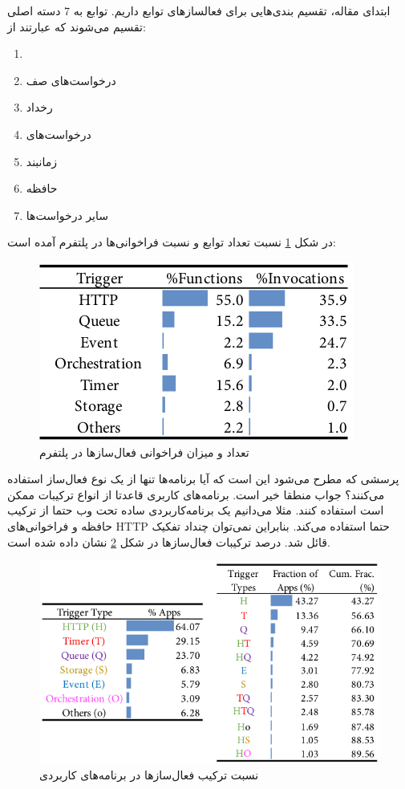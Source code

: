 ابتدای مقاله‌، تقسیم بندی‌هایی برای فعالساز‌های توابع داریم. توابع به 7 دسته اصلی تقسیم می‌شوند که عبارتند از: 

\begin{enumerate}
	\item {}
	\item درخواست‌های صف
	\item رخداد
	\item درخواست‌های 
	\item زمانبند
	\item حافظه
	\item سایر درخواست‌ها
\end{enumerate}

در شکل \ref{fig:Azure-Trigger-invocations} نسبت تعداد توابع و نسبت فراخوانی‌ها در پلتفرم  آمده است:‌

\begin{figure}
	\centering
	\includegraphics[width=0.8\linewidth]{figs/Azure-Trigger-invocations}
	\caption {تعداد و میزان فراخوانی فعال‌سازها در پلتفرم }
	\label{fig:Azure-Trigger-invocations}
\end{figure}

پرسشی که مطرح می‌شود این است که آیا برنامه‌ها تنها از یک نوع فعال‌ساز استفاده می‌کنند؟ جواب منطقا خیر است. برنامه‌های کاربری قاعدتا از انواع ترکیبات ممکن است استفاده کنند. مثلا می‌دانیم یک برنامه‌کاربردی ساده تحت وب حتما از ترکیب حافظه و فراخوانی‌های HTTP حتما استفاده می‌کند. بنابراین نمی‌توان چنداد تفکیک قائل شد. درصد ترکیبات فعال‌ساز‌ها در شکل \ref{fig:Azure-function-compositions-applications} نشان داده شده است. 

\begin{figure}
	\centering
	\includegraphics[width=0.7\linewidth]{figs/Azure-function-compositions-applications}
	\caption {نسبت ترکیب فعال‌سازها در برنامه‌های کاربردی}
	\label{fig:Azure-function-compositions-applications}
\end{figure}

